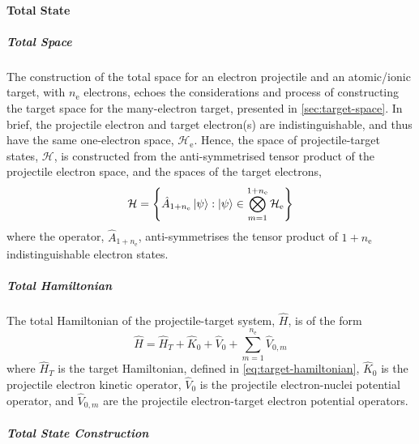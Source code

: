 \documentclass[draft]{article}
\begin{document}
\paragraph{Total State}
\label{sec:total-state}

\subparagraph{Total Space}
\label{sec:total-space}

The construction of the total space for an electron projectile and an
atomic/ionic target, with $n_{\mathrm{e}}$ electrons, echoes the considerations
and process of constructing the target space for the many-electron target,
presented in \autoref{sec:target-space}.
In brief, the projectile electron and target electron(s) are indistinguishable,
and thus have the same one-electron space, $\mathcal{H}_{\mathrm{e}}$.
Hence, the space of projectile-target states, $\mathcal{H}$, is constructed from
the anti-symmetrised tensor product of the projectile electron space, and the
spaces of the target electrons,
\begin{equation}
  \label{eq:total-space}
  \mathcal{H}
  =
  \lrset[\Bigg]
  {
    \hat{A}_{1 + n_{\mathrm{e}}}
    \ket{\psi}
    :
    \ket{\psi}
    \in
    \bigotimes_{m = 1}^{1 + n_{\mathrm{e}}}
    \mathcal{H}_{\mathrm{e}}
  }
\end{equation}
where the operator, $\hat{A}_{1 + n_{\mathrm{e}}}$, anti-symmetrises the tensor
product of $1 + n_{\mathrm{e}}$ indistinguishable electron states.

\subparagraph{Total Hamiltonian}
\label{sec:total-hamiltonian}

The total Hamiltonian of the projectile-target system, $\hat{H}$, is of the form
\begin{equation}
  \label{eq:total-hamiltonian}
  \hat{H}
  =
  \hat{H}_{T}
  +
  \hat{K}_{0}
  +
  \hat{V}_{0}
  +
  \sum_{m = 1}^{n_{\mathrm{e}}}
  \hat{V}_{0, m}
\end{equation}
where $\hat{H}_{T}$ is the target Hamiltonian, defined in
\autoref{eq:target-hamiltonian}, $\hat{K}_{0}$ is the projectile electron
kinetic operator, $\hat{V}_{0}$ is the projectile electron-nuclei potential
operator, and $\hat{V}_{0, m}$ are the projectile electron-target electron
potential operators.

\subparagraph{Total State Construction}
\label{sec:total-state-construction}
\end{document}
